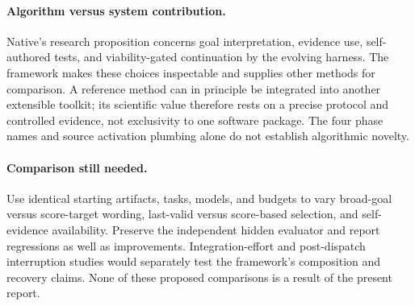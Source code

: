 \paragraph{Algorithm versus system contribution.}
Native's research proposition concerns goal interpretation, evidence use, self-authored tests, and viability-gated continuation by the evolving harness. The framework makes these choices inspectable and supplies other methods for comparison. A reference method can in principle be integrated into another extensible toolkit; its scientific value therefore rests on a precise protocol and controlled evidence, not exclusivity to one software package. The four phase names and source activation plumbing alone do not establish algorithmic novelty.

\paragraph{Comparison still needed.}
Use identical starting artifacts, tasks, models, and budgets to vary broad-goal versus score-target wording, last-valid versus score-based selection, and self-evidence availability. Preserve the independent hidden evaluator and report regressions as well as improvements. Integration-effort and post-dispatch interruption studies would separately test the framework's composition and recovery claims. None of these proposed comparisons is a result of the present report.
